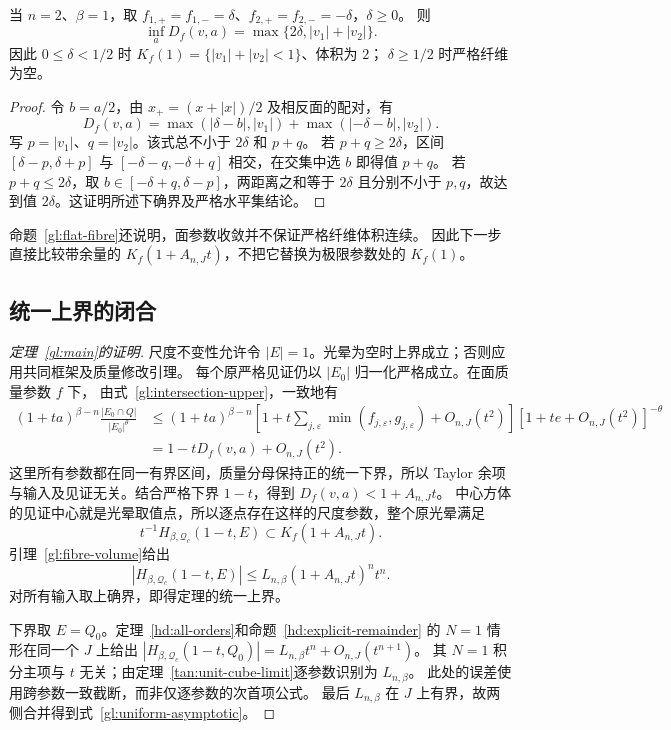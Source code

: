 \begin{proposition}[半阶面模型的非刚性与严格阈值]\label{gl:flat-fibre}
当 $n=2$、$\beta=1$，取
$f_{1,+}=f_{1,-}=\delta$、$f_{2,+}=f_{2,-}=-\delta$，$\delta\ge0$。
则
\[
 \inf_aD_f(v,a)=\max\{2\delta,|v_1|+|v_2|\}.
\]
因此 $0\le\delta<1/2$ 时 $K_f(1)=\{|v_1|+|v_2|<1\}$、体积为 $2$；
$\delta\ge1/2$ 时严格纤维为空。
\end{proposition}
\begin{proof}
令 $b=a/2$，由 $x_+=(x+|x|)/2$ 及相反面的配对，有
\[
 D_f(v,a)=\max(|\delta-b|,|v_1|)+\max(|-\delta-b|,|v_2|).
\]
写 $p=|v_1|$、$q=|v_2|$。该式总不小于 $2\delta$ 和 $p+q$。
若 $p+q\ge2\delta$，区间 $[\delta-p,\delta+p]$ 与
$[-\delta-q,-\delta+q]$ 相交，在交集中选 $b$ 即得值 $p+q$。
若 $p+q\le2\delta$，取 $b\in[-\delta+q,\delta-p]$，两距离之和等于
$2\delta$ 且分别不小于 $p,q$，故达到值 $2\delta$。这证明所述下确界及严格水平集结论。
\end{proof}

命题~\ref{gl:flat-fibre}还说明，面参数收敛并不保证严格纤维体积连续。
因此下一步直接比较带余量的 $K_f(1+A_{n,J}t)$，不把它替换为极限参数处的 $K_f(1)$。

\subsection{统一上界的闭合}
\begin{proof}[定理~\ref{gl:main}的证明]
尺度不变性允许令 $|E|=1$。光晕为空时上界成立；否则应用共同框架及质量修改引理。
每个原严格见证仍以 $|E_0|$ 归一化严格成立。在面质量参数 $f$ 下，
由式~\eqref{gl:intersection-upper}，一致地有
\begin{align*}
 (1+ta)^{\beta-n}\frac{|E_0\cap Q|}{|E_0|^\theta}
 &\le(1+ta)^{\beta-n}
 [1+t\sum_{j,\varepsilon}\min(f_{j,\varepsilon},g_{j,\varepsilon})+O_{n,J}(t^2)]
 [1+te+O_{n,J}(t^2)]^{-\theta}\\
 &=1-tD_f(v,a)+O_{n,J}(t^2).
\end{align*}
这里所有参数都在同一有界区间，质量分母保持正的统一下界，所以 Taylor 余项
与输入及见证无关。结合严格下界 $1-t$，得到 $D_f(v,a)<1+A_{n,J}t$。
中心方体的见证中心就是光晕取值点，所以逐点存在这样的尺度参数，整个原光晕满足
\[
 t^{-1}H_{\beta,\mathcal Q_c}(1-t,E)\subset K_f(1+A_{n,J}t).
\]
引理~\ref{gl:fibre-volume}给出
\[
 |H_{\beta,\mathcal Q_c}(1-t,E)|\le
 L_{n,\beta}(1+A_{n,J}t)^n t^n.
\]
对所有输入取上确界，即得定理的统一上界。

下界取 $E=Q_0$。定理~\ref{hd:all-orders}和命题~\ref{hd:explicit-remainder}
的 $N=1$ 情形在同一个 $J$ 上给出
$|H_{\beta,\mathcal Q_c}(1-t,Q_0)|=L_{n,\beta}t^n+O_{n,J}(t^{n+1})$。
其 $N=1$ 积分主项与 $t$ 无关；由定理~\ref{tan:unit-cube-limit}逐参数识别为 $L_{n,\beta}$。
此处的误差使用跨参数一致截断，而非仅逐参数的次首项公式。
最后 $L_{n,\beta}$ 在 $J$ 上有界，故两侧合并得到式~\eqref{gl:uniform-asymptotic}。
\end{proof}

